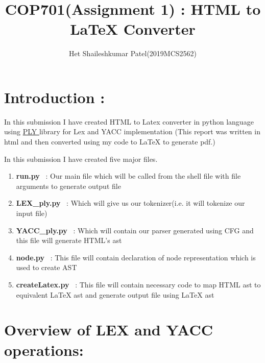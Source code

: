 \documentclass{article}
\author{Het Shaileshkumar Patel(2019MCS2562)}
\title{COP701(Assignment 1) : HTML to LaTeX Converter}
\begin{document}
\maketitle

%
%  
\section{Introduction :
}
\par
In this submission I have created HTML to Latex converter in python language using 
\href{https://www.dabeaz.com/ply/ply.html}{PLY
}
library for Lex and YACC implementation
{\fontsize{4}{4}\selectfont (This report was written in html and then converted using my code to LaTeX to generate pdf.)
}\ \par
In this submission I have created five major files.
\begin{enumerate}
\item \textbf{run.py
}\ : Our main file which will be called from the shell file with file arguments to generate output file

\item \textbf{LEX\_ply.py
}\ : Which will give us our tokenizer(i.e. it will tokenize our input file)

\item \textbf{YACC\_ply.py
}\ : Which will contain our parser generated using CFG and this file will generate HTML's ast

\item \textbf{node.py
}\ : This file will contain declaration of node representation which is used to create AST

\item \textbf{createLatex.py
}\ : This file will contain necessary code to map HTML ast to equivalent LaTeX ast and generate output file using LaTeX ast

\end{enumerate}
\section{Overview of LEX and YACC operations:
}
\end{document}
